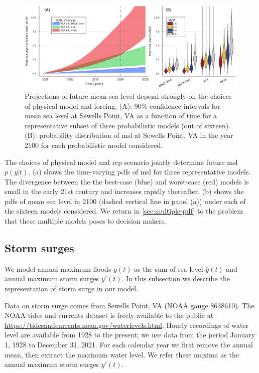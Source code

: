 \documentclass[11pt]{article}
\begin{document}
\begin{figure}
    \centering
    \includegraphics[width=\textwidth]{lsl-evolution}
    \caption{
        Projections of future mean sea level depend strongly on the choices of physical model and forcing.
        (A): 90\% confidence intervals for mean sea level at Sewells Point, VA as a function of time for a representative subset of three probabilistic models (out of sixteen).
        (B): probability distribution of \gls{msl} at Sewells Point, VA in the year 2100 for each probabilistic model considered.
    }\label{fig:lsl-evolution}
\end{figure}

The choices of physical model and \gls{rcp} scenario jointly determine future \gls{msl} $p(\overline{y}|t)$.
(a) shows the time-varying \glspl{pdf} of \gls{msl} for three representative models.
The divergence between the the best-case (blue) and worst-case (red) models is small in the early 21st century and increases rapidly thereafter.
(b) shows the \glspl{pdf} of mean sea level in 2100 (dashed vertical line in panel (a)) under each of the sixteen models considered.
We return in \cref{sec:multiple-pdf} to the problem that these multiple models poses to decision makers.

\subsection{Storm surges}\label{sec:storm-surge}

We model annual maximum floods $y(t)$ as the sum of sea level $\overline{y}(t)$ and annual maximum storm surges $y'(t)$.
In this subsection we describe the representation of storm surge in our model.

Data on storm surge comes from Sewells Point, VA (NOAA gauge 8638610).
The NOAA tides and currents dataset is freely available to the public at \url{https://tidesandcurrents.noaa.gov/waterlevels.html}.
Hourly recordings of water level are available from 1928 to the present; we use data from the period January 1, 1928 to December 31, 2021.
For each calendar year we first remove the annual mean, then extract the maximum water level.
We refer these maxima as the annual maximum storm surges $y'(t)$.
\end{document}
